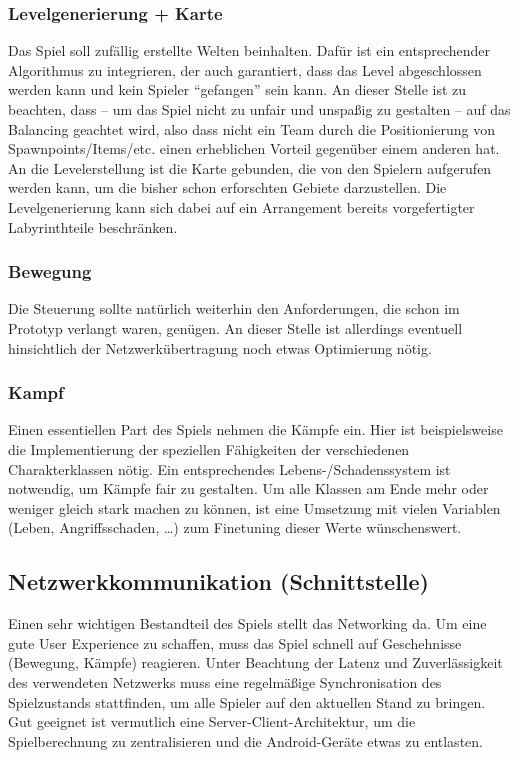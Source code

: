 \documentclass[10pt,a4paper,notitlepage]{report}
\begin{document}
\begin{flushleft}
\subsubsection{Levelgenerierung + Karte}
Das Spiel soll zufällig erstellte Welten beinhalten. Dafür ist ein entsprechender Algorithmus zu integrieren, der auch garantiert, dass das Level abgeschlossen werden kann und kein Spieler \enquote{gefangen} sein kann. An dieser Stelle ist zu beachten, dass – um das Spiel nicht zu unfair und unspaßig zu gestalten – auf das Balancing geachtet wird, also dass nicht ein Team durch die Positionierung von Spawnpoints/Items/etc. einen erheblichen Vorteil gegenüber einem anderen hat. An die Levelerstellung ist die Karte gebunden, die von den Spielern aufgerufen werden kann, um die bisher schon erforschten Gebiete darzustellen. Die Levelgenerierung kann sich dabei auf ein Arrangement bereits vorgefertigter Labyrinthteile beschränken.

\subsubsection{Bewegung}
Die Steuerung sollte natürlich weiterhin den Anforderungen, die schon im Prototyp verlangt waren, genügen. An dieser Stelle ist allerdings eventuell hinsichtlich der Netzwerkübertragung noch etwas Optimierung nötig. 

\subsubsection{Kampf} 
Einen essentiellen Part des Spiels nehmen die Kämpfe ein. Hier ist beispielsweise die Implementierung der speziellen Fähigkeiten der verschiedenen Charakterklassen nötig. Ein entsprechendes Lebens-/Schadenssystem ist notwendig, um Kämpfe fair zu gestalten. Um alle Klassen am Ende mehr oder weniger gleich stark machen zu können, ist eine Umsetzung mit vielen Variablen (Leben, Angriffsschaden, …) zum Finetuning dieser Werte wünschenswert. 

\subsection{Netzwerkkommunikation (Schnittstelle)}
Einen sehr wichtigen Bestandteil des Spiels stellt das Networking da. Um eine gute User Experience zu schaffen, muss das Spiel schnell auf Geschehnisse (Bewegung, Kämpfe) reagieren. Unter Beachtung der Latenz und Zuverlässigkeit des verwendeten Netzwerks muss eine regelmäßige Synchronisation des Spielzustands stattfinden, um alle Spieler auf den aktuellen Stand zu bringen. Gut geeignet ist vermutlich eine Server-Client-Architektur, um die Spielberechnung zu zentralisieren und die Android-Geräte etwas zu entlasten. 


\end{flushleft}
\end{document}
